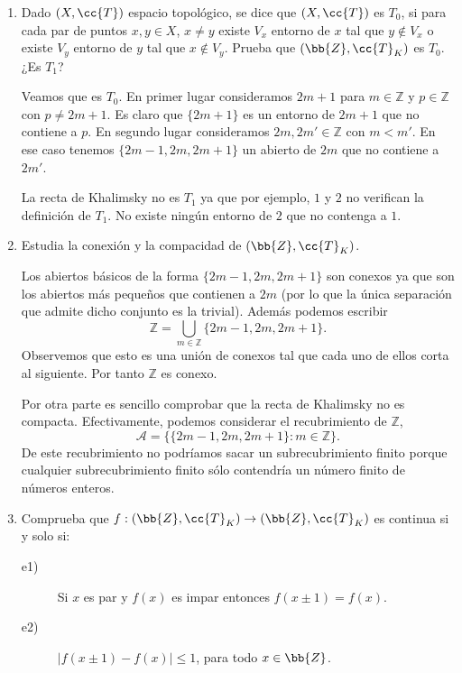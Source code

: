 \documentclass[12pt]{article}
\begin{document}
\begin{ejercicio}
\begin{enumerate}[label=\alph*)]
            \item Dado $(X, \cc{T})$ espacio topológico, se dice que $(X, \cc{T})$ es $T_0$, si para cada par de puntos $x, y \in X$, $x \neq y$ existe $V_x$ entorno de $x$ tal que $y \notin V_x$ o existe $V_y$ entorno de $y$ tal que $x \notin V_y$. Prueba que $(\bb{Z}, \cc{T}_K)$ es $T_0$. ¿Es $T_1$?

                Veamos que es $T_0$. En primer lugar consideramos $2m+1$ para $m \in \mathbb{Z}$ y $p \in \mathbb{Z}$ con $p \neq 2m+1$. Es claro que $\{2m+1\}$ es un entorno de $2m+1$ que no contiene a $p$. En segundo lugar consideramos $2m, 2m' \in \mathbb{Z}$ con $m < m'$. En ese caso tenemos $\{2m-1, 2m, 2m+1\}$ un abierto de $2m$ que no contiene a $2m'$.
            
                La recta de Khalimsky no es $T_1$ ya que por ejemplo, $1$ y $2$ no verifican la definición de $T_1$. No existe ningún entorno de $2$ que no contenga a $1$.
                
            \item Estudia la conexión y la compacidad de $(\bb{Z}, \cc{T}_K)$.
                    
                Los abiertos básicos de la forma $\{2m-1, 2m, 2m+1\}$ son conexos ya que son los abiertos más pequeños que contienen a $2m$ (por lo que la única separación que admite dicho conjunto es la trivial). Además podemos escribir
                \[
                \mathbb{Z} = \bigcup_{m \in \mathbb{Z}} \{2m-1, 2m, 2m+1\}.
                \]
                Observemos que esto es una unión de conexos tal que cada uno de ellos corta al siguiente. Por tanto $\mathbb{Z}$ es conexo.
                
                Por otra parte es sencillo comprobar que la recta de Khalimsky no es compacta. Efectivamente, podemos considerar el recubrimiento de $\mathbb{Z}$,
                \[
                \mathcal{A} = \{\{2m-1, 2m, 2m+1\} : m \in \mathbb{Z}\}.
                \]
                De este recubrimiento no podríamos sacar un subrecubrimiento finito porque cualquier subrecubrimiento finito sólo contendría un número finito de números enteros.
            
            \item Comprueba que $f : (\bb{Z}, \cc{T}_K) \to (\bb{Z}, \cc{T}_K)$ es continua si y solo si:
            \begin{description}
                \item[e1)] Si $x$ es par y $f(x)$ es impar entonces $f(x \pm 1) = f(x)$.
                \item[e2)] $|f(x \pm 1) - f(x)| \leq 1$, para todo $x \in \bb{Z}$.
            \end{description}


\end{enumerate}
\end{ejercicio}
\end{document}
